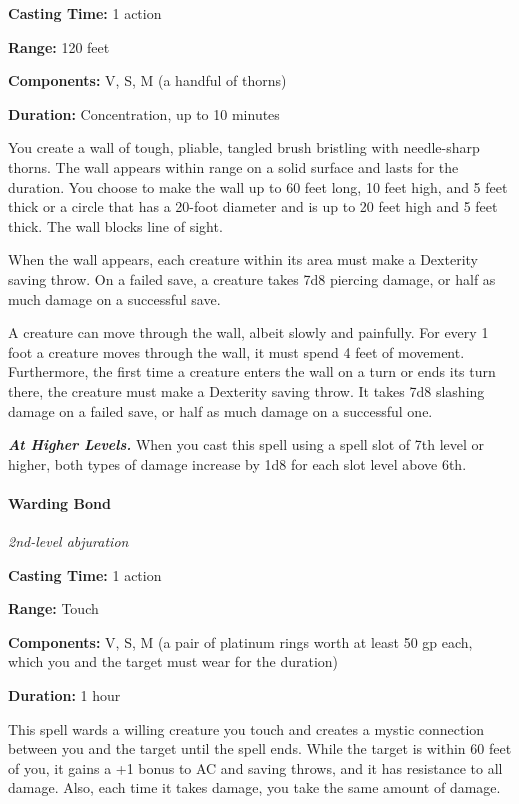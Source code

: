 \documentclass[
]{article}
\begin{document}
\textbf{Casting Time:} 1 action

\textbf{Range:} 120 feet

\textbf{Components:} V, S, M (a handful of thorns)

\textbf{Duration:} Concentration, up to 10 minutes

You create a wall of tough, pliable, tangled brush bristling with
needle-sharp thorns. The wall appears within range on a solid surface
and lasts for the duration. You choose to make the wall up to 60 feet
long, 10 feet high, and 5 feet thick or a circle that has a 20-foot
diameter and is up to 20 feet high and 5 feet thick. The wall blocks
line of sight.

When the wall appears, each creature within its area must make a
Dexterity saving throw. On a failed save, a creature takes 7d8 piercing
damage, or half as much damage on a successful save.

A creature can move through the wall, albeit slowly and painfully. For
every 1 foot a creature moves through the wall, it must spend 4 feet of
movement. Furthermore, the first time a creature enters the wall on a
turn or ends its turn there, the creature must make a Dexterity saving
throw. It takes 7d8 slashing damage on a failed save, or half as much
damage on a successful one.

\emph{\textbf{At Higher Levels.}} When you cast this spell using a spell
slot of 7th level or higher, both types of damage increase by 1d8 for
each slot level above 6th.

\hypertarget{warding-bond}{%
\paragraph{Warding Bond}\label{warding-bond}}

\emph{2nd-level abjuration}

\textbf{Casting Time:} 1 action

\textbf{Range:} Touch

\textbf{Components:} V, S, M (a pair of platinum rings worth at least 50
gp each, which you and the target must wear for the duration)

\textbf{Duration:} 1 hour

This spell wards a willing creature you touch and creates a mystic
connection between you and the target until the spell ends. While the
target is within 60 feet of you, it gains a +1 bonus to AC and saving
throws, and it has resistance to all damage. Also, each time it takes
damage, you take the same amount of damage.
\end{document}
